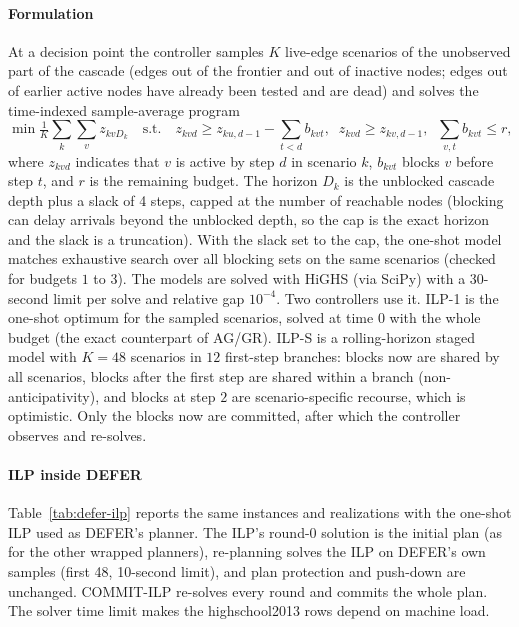 \documentclass[preprint,11pt]{elsarticle}
\theoremstyle{definition}
\theoremstyle{remark}
\begin{document}
\paragraph{Formulation} At a decision point the controller samples $K$
live-edge scenarios of the unobserved part of the cascade (edges out of the
frontier and out of inactive nodes; edges out of earlier active nodes have
already been tested and are dead) and solves the time-indexed sample-average
program
\[
\min \tfrac1K\sum_k\sum_v z_{kvD_k}\quad\text{s.t.}\quad
z_{kvd}\ge z_{ku,d-1}-\sum_{t<d}b_{kvt},\;\; z_{kvd}\ge z_{kv,d-1},\;\;
\sum_{v,t}b_{kvt}\le r,
\]
where $z_{kvd}$ indicates that $v$ is active by step $d$ in scenario $k$,
$b_{kvt}$ blocks $v$ before step $t$, and $r$ is the remaining budget. The
horizon $D_k$ is the unblocked cascade depth plus a slack of 4 steps, capped at
the number of reachable nodes (blocking can delay arrivals beyond the unblocked
depth, so the cap is the exact horizon and the slack is a truncation). With
the slack set to the cap, the one-shot model matches exhaustive search over all
blocking sets on the same scenarios (checked for budgets
$1$ to $3$). The models are solved with HiGHS (via SciPy) with a 30-second limit per
solve and relative gap $10^{-4}$. Two controllers use it.
ILP-1 is the one-shot optimum for the sampled scenarios, solved at time
$0$ with the whole budget (the exact counterpart of AG/GR).
ILP-S is a rolling-horizon staged model with $K=48$ scenarios in
$12$ first-step branches: blocks now are shared by all scenarios, blocks after
the first step are shared within a branch (non-anticipativity), and blocks at
step $2$ are scenario-specific recourse, which is optimistic. Only the blocks
now are committed, after which the controller observes and re-solves.

\paragraph{ILP inside DEFER} Table~\ref{tab:defer-ilp} reports the same
instances and realizations with the one-shot ILP used as DEFER's planner. The
ILP's round-0 solution is the initial plan (as for the other wrapped planners),
re-planning solves the ILP on DEFER's own samples (first 48, 10-second limit),
and plan protection and push-down are unchanged. COMMIT-ILP re-solves
every round and commits the whole plan. The solver time limit makes the
highschool2013 rows depend on machine load.
\end{document}
